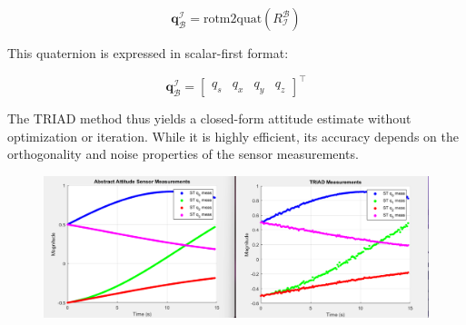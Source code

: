 \begin{equation}
    \mathbf{q}_{\mathcal{B}}^{\mathcal{I}} = \text{rotm2quat}(R_{\mathcal{I}}^{\mathcal{B}})
\end{equation}

This quaternion is expressed in scalar-first format:

\begin{equation}
    \mathbf{q}_{\mathcal{B}}^{\mathcal{I}} = \begin{bmatrix} q_s & q_x & q_y & q_z \end{bmatrix}^\top
\end{equation}

The TRIAD method thus yields a closed-form attitude estimate without optimization or iteration. While it is highly efficient, its accuracy depends on the orthogonality and noise properties of the sensor measurements.

\begin{figure}[H]
    \centering
    \includegraphics[width=1\textwidth]{figures/modelling/TRIAD.png}
    \caption{}
    \label{fig:CSS}
\end{figure}

\label{sec:modconclusion}